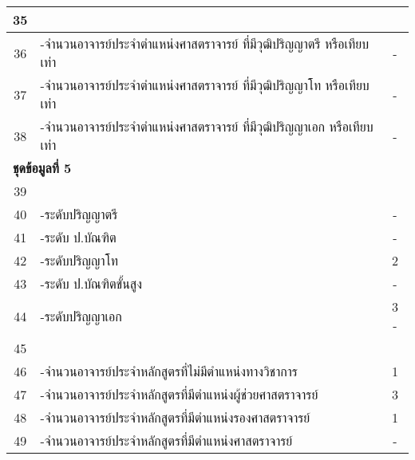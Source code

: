 \begin{longtable}{|c|p{}|c|}
	35&\cellcolor{red!10}{จำนวนอาจารย์ประจำทั้งหมดที่ดำรงตำแหน่งศาสตราจารย์}&\cellcolor{red!10}{\textbf{-}}\\\hline
	36&-จำนวนอาจารย์ประจำตำแหน่งศาสตราจารย์ ที่มีวุฒิปริญญาตรี หรือเทียบเท่า &-\\\hline
	37&-จำนวนอาจารย์ประจำตำแหน่งศาสตราจารย์ ที่มีวุฒิปริญญาโท หรือเทียบเท่า& -\\\hline
	38&-จำนวนอาจารย์ประจำตำแหน่งศาสตราจารย์ ที่มีวุฒิปริญญาเอก หรือเทียบเท่า & -\\\hline
	
	\multicolumn{3}{|l|}{\textbf{ชุดข้อมูลที่ 5}}\\\hline
	39&\cellcolor{red!10}{จำนวนอาจารย์ผู้รับผิดชอบหลักสูตรแยกตามวุฒิการศึกษา}&\cellcolor{red!10}{\textbf{5}}\\\hline
	40&-ระดับปริญญาตรี&-\\\hline
	41&-ระดับ ป.บัณฑิต& - \\\hline
	42&-ระดับปริญญาโท & 2\\\hline
	43&-ระดับ ป.บัณฑิตขั้นสูง& - \\\hline
	44&-ระดับปริญญาเอก& 3  - \\\hline
	
	45&\cellcolor{red!10}{จำนวนอาจารย์ผู้รับผิดชอบหลักสูตรที่ดำรงตำแหน่งทางวิชาการ}&\cellcolor{red!10}{\textbf{5}}\\\hline
	46&-จำนวนอาจารย์ประจำหลักสูตรที่ไม่มีตำแหน่งทางวิชาการ&1\\\hline
	47&-จำนวนอาจารย์ประจำหลักสูตรที่มีตำแหน่งผู้ช่วยศาสตราจารย์& 3 \\\hline
	48&-จำนวนอาจารย์ประจำหลักสูตรที่มีตำแหน่งรองศาสตราจารย์ & 1\\\hline
	49&-จำนวนอาจารย์ประจำหลักสูตรที่มีตำแหน่งศาสตราจารย์& - \\\hline
	

\end{longtable}
